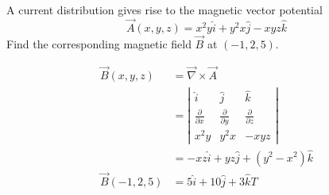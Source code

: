 \begin{exercise}
	A current distribution gives rise to the magnetic vector potential
	$$
	\vec{A}(x, y, z)=x^{2} y \hat{i}+y^{2} x \hat{j}-x y z \hat{k} 
	$$
	Find the corresponding magnetic field $\vec{B}$ at $(-1,2,5)$.
\end{exercise}
\begin{answer}
	\begin{align*}
	\vec{B}(x, y, z)&=\vec{\nabla} \times \vec{A}\\&=\left|\begin{array}{ccc}
	\hat{i} & \hat{j} & \hat{k} \\
	\frac{\partial}{\partial x} & \frac{\partial}{\partial y} & \frac{\partial}{\partial z} \\
	x^{2} y & y^{2} x & -x y z
	\end{array}\right|\\&=-x z \hat{i}+y z \hat{j}+\left(y^{2}-x^{2}\right) \hat{k}\\
	\vec{B}(-1,2,5)&=5 \hat{i}+10 \hat{j}+3 \hat{k} T
	\end{align*}
\end{answer}
